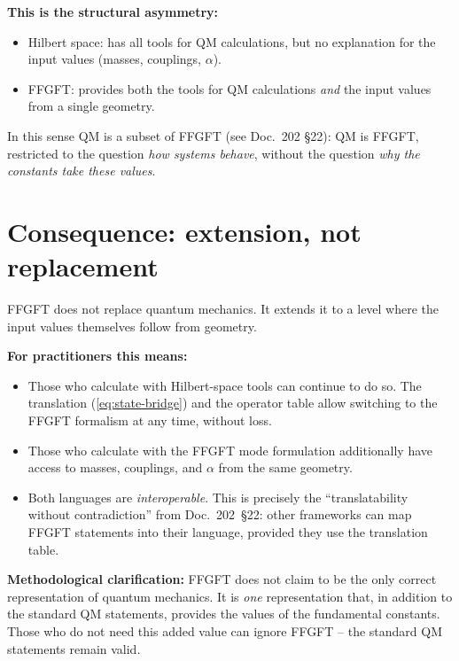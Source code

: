 \textbf{This is the structural asymmetry:}
\begin{itemize}[leftmargin=2em,itemsep=2pt,topsep=2pt]
  \item Hilbert space: has all tools for QM calculations, but no
        explanation for the input values (masses, couplings,
        $\alpha$).
  \item FFGFT: provides both the tools for QM calculations
        \emph{and} the input values from a single geometry.
\end{itemize}

In this sense QM is a subset of FFGFT (see Doc.~202 §22): QM is
FFGFT, restricted to the question \emph{how systems behave}, without
the question \emph{why the constants take these values}.

\section{Consequence: extension, not replacement}

FFGFT does not replace quantum mechanics. It extends it to a level
where the input values themselves follow from geometry.

\textbf{For practitioners this means:}
\begin{itemize}[leftmargin=2em,itemsep=2pt,topsep=2pt]
  \item Those who calculate with Hilbert-space tools can continue to
        do so. The translation (\ref{eq:state-bridge}) and the
        operator table allow switching to the FFGFT formalism at any
        time, without loss.
  \item Those who calculate with the FFGFT mode formulation
        additionally have access to masses, couplings, and $\alpha$
        from the same geometry.
  \item Both languages are \emph{interoperable}. This is precisely
        the \enquote{translatability without contradiction} from
        Doc.~202~§22: other frameworks can map FFGFT statements into
        their language, provided they use the translation table.
\end{itemize}

\textbf{Methodological clarification:} FFGFT does not claim to be
the only correct representation of quantum mechanics. It is
\emph{one} representation that, in addition to the standard QM
statements, provides the values of the fundamental constants. Those
who do not need this added value can ignore FFGFT -- the standard
QM statements remain valid.

